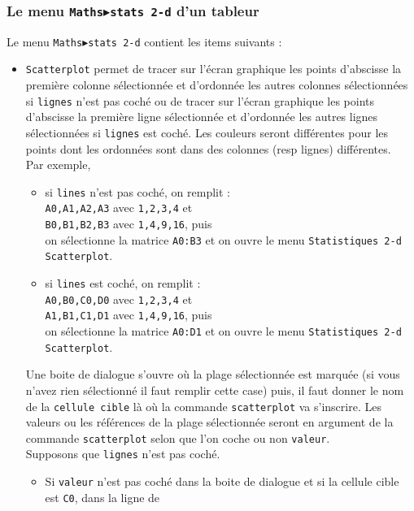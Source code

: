 \documentclass[a4paper,11pt]{book}
\begin{document}
\subsubsection{Le menu {\tt Maths$\blacktriangleright$stats 2-d} d'un tableur}
Le menu {\tt Maths$\blacktriangleright$stats 2-d} contient les items suivants :
\begin{itemize}
\item {\tt Scatterplot} permet de tracer sur l'\'ecran graphique les points 
d'abscisse la premi\`ere colonne s\'electionn\'ee et d'ordonn\'ee les autres 
colonnes s\'electionn\'ees si {\tt lignes} n'est pas coch\'e ou de tracer sur 
l'\'ecran graphique les points d'abscisse la premi\`ere ligne s\'electionn\'ee 
et d'ordonn\'ee les autres lignes s\'electionn\'ees si {\tt lignes} est 
coch\'e. Les couleurs seront diff\'erentes pour les points
dont les ordonn\'ees sont dans des colonnes (resp lignes) diff\'erentes.\\
Par exemple,
\begin{itemize}
\item  si {\tt lines} n'est pas coch\'e, on remplit :\\
{\tt A0,A1,A2,A3} avec {\tt 1,2,3,4} et \\
{\tt B0,B1,B2,B3} avec {\tt 1,4,9,16}, puis \\
on s\'electionne la matrice {\tt A0:B3} et on ouvre le menu 
{\tt Statistiques 2-d  Scatterplot}.
\item  si {\tt lines} est coch\'e, on remplit :\\
{\tt A0,B0,C0,D0} avec {\tt 1,2,3,4} et \\
{\tt A1,B1,C1,D1} avec {\tt 1,4,9,16}, puis \\
on s\'electionne la matrice {\tt A0:D1} et on ouvre le menu 
{\tt Statistiques 2-d  Scatterplot}.
\end{itemize}
Une boite de dialogue s'ouvre o\`u la plage s\'electionn\'ee est marqu\'ee 
(si vous n'avez rien s\'electionn\'e il faut remplir cette case) puis,
il faut donner le nom de la {\tt cellule cible} l\`a o\`u la commande 
{\tt scatterplot} va s'inscrire. Les valeurs ou les r\'ef\'erences de la plage 
s\'electionn\'ee seront en argument de la commande {\tt scatterplot} selon que 
l'on coche ou non {\tt valeur}.\\
Supposons que {\tt lignes} n'est pas coch\'e.
\begin{itemize}
\item Si {\tt valeur} n'est pas coch\'e dans la boite de dialogue et si la 
cellule cible est {\tt C0}, dans la ligne de 

\end{itemize}
\end{itemize}
\end{document}
